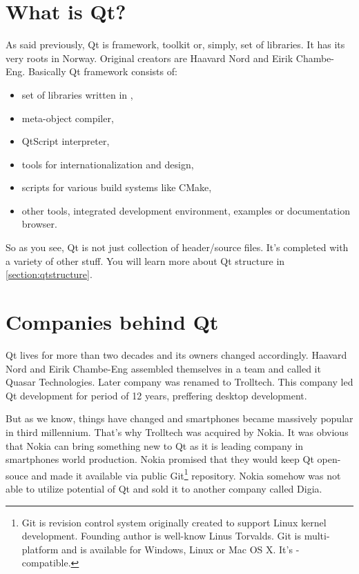\section{What is Qt?}\label{section:what}
As said previously, Qt is framework, toolkit or, simply, set of libraries. It has its very roots in Norway. Original creators are Haavard Nord and Eirik Chambe-Eng. \citep[section History]{various:qtwikip} Basically Qt framework consists of:
\begin{itemize}
\item set of libraries written in \cpp,
\item meta-object compiler,
\item QtScript interpreter,
\item tools for internationalization and  design,
\item scripts for various build systems like CMake,
\item other tools, \eg integrated development environment, examples or documentation browser.
\end{itemize}

So as you see, Qt is not just collection of header/source files. It's completed with a variety of other stuff. You will learn more about Qt structure in \autoref{section:qtstructure}.

\section{Companies behind Qt}
Qt lives for more than two decades and its owners changed accordingly. Haavard Nord and Eirik Chambe-Eng assembled themselves in a team and called it Quasar Technologies. Later company was renamed to Trolltech. This company led Qt development for period of 12 years, preffering desktop development.


But as we know, things have changed and smartphones became massively popular in third millennium. That's why Trolltech was acquired by Nokia. It was obvious that Nokia can bring something new to Qt as it is leading company in smartphones world production. Nokia promised that they would keep Qt open-souce and made it available via public Git\footnote{Git is revision control system originally created to support Linux kernel development. Founding author is well-know Linus Torvalds. Git is multi-platform and is available for Windows, Linux or Mac OS X. It's -compatible.} repository. Nokia somehow was not able to utilize potential of Qt and sold it to another company called Digia. \citep{various:qtwikip}

